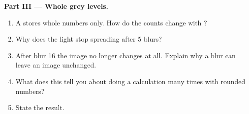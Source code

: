 \begin{problem}
\medskip\noindent\textbf{Part III --- Whole grey levels.}
\begin{enumerate}[resume]
  \item A  stores whole numbers only. How do the counts change with
    ?
  \item Why does the light stop spreading after 5 blurs?
  \item After blur 16 the image no longer changes at all. Explain why a blur can
    leave an image unchanged.
  \item What does this tell you about doing a calculation many times with
    rounded numbers?
  \item State the result.
\end{enumerate}
\end{problem}
